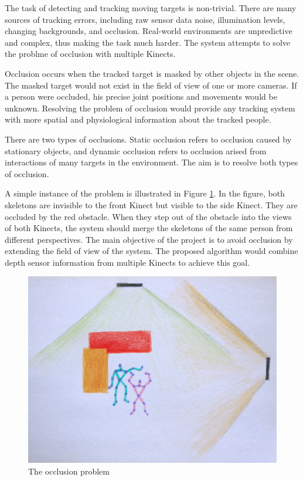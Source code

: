\documentclass{sigchi}
\begin{document}
The task of detecting and tracking moving targets is non-trivial. There are many sources of tracking errors, including raw sensor data noise, illumination levels, changing backgrounds, and occlusion. Real-world environments are unpredictive and complex, thus making the task much harder. The system attempts to solve the problme of occlusion with multiple Kinects.

Occlusion occurs when the tracked target is masked by other objects in the scene. The masked target would not exist in the field of view of one or more cameras. If a person were occluded, his precise joint positions and movements would be unknown. Resolving the problem of occlusion would provide any tracking system with more spatial and physiological information about the tracked people.

There are two types of occlusions. Static occlusion refers to occlusion caused by stationary objects, and dynamic occlusion refers to occlusion arised from interactions of many targets in the environment. The aim is to resolve both types of occlusion.

A simple instance of the problem is illustrated in Figure \ref{fig:occlusion_problem}. In the figure, both skeletons are invisible to the front Kinect but visible to the side Kinect. They are occluded by the red obstacle. When they step out of the obstacle into the views of both Kinects, the system should merge the skeletons of the same person from different perspectives. The main objective of the project is to avoid occlusion by extending the field of view of the system. The proposed algorithm would combine depth sensor information from multiple Kinects to achieve this goal.

\begin{figure}[!h]
  \centering
  \includegraphics[width=0.9\columnwidth]{occlusion_problem}
  \caption{The occlusion problem}
  \label{fig:occlusion_problem}
\end{figure}
\end{document}
